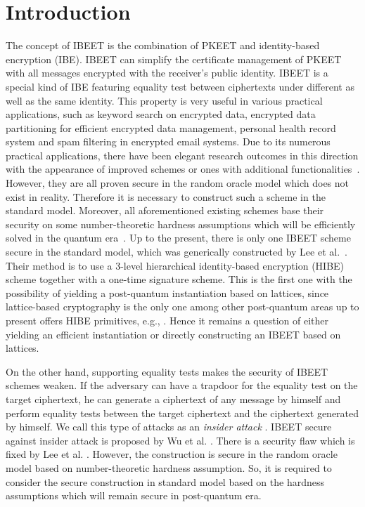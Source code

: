 \documentclass[runningheads]{llncs}
\begin{document}
	\section{Introduction}
	
	The concept of IBEET is the combination of PKEET and identity-based encryption (IBE). IBEET can simplify the certificate management of PKEET with all messages encrypted with the receiver's public identity. IBEET is a special kind of IBE featuring equality test between ciphertexts under different as well as the same identity. This property is very useful in various practical applications, such as keyword search on encrypted data, encrypted data partitioning for efficient encrypted data management, personal health record system and spam filtering in encrypted email systems. Due to its numerous practical applications, there have been elegant research outcomes in this direction with the appearance of improved schemes or ones with additional functionalities~\cite{IBEET-Ma16,Lee16,IBEET-Wu17}. However, they are all proven  secure in the random oracle model which does not exist in reality. Therefore it is necessary to construct such a scheme in the standard model. Moreover, all aforementioned existing schemes base their security on some number-theoretic hardness assumptions which will be efficiently solved in the quantum era~\cite{Shor97}.  Up to the present, there is only one IBEET scheme secure in the standard model, which was generically constructed by Lee et al.~\cite{Lee2016}. Their method is to use a $3$-level hierarchical identity-based encryption (HIBE) scheme together with a one-time signature scheme.  This is the first one with the possibility of yielding a post-quantum instantiation based on lattices, since lattice-based cryptography is the only one among other post-quantum areas up to present offers  HIBE primitives, e.g., \cite{ABB10-EuroCrypt} . Hence it remains a question of either yielding an efficient instantiation or directly constructing an IBEET based on lattices.

On the other hand, supporting equality tests makes the security of IBEET schemes weaken. If the adversary can have a trapdoor for the equality test on the target ciphertext, he can generate a ciphertext of any message by himself and perform equality tests between the target ciphertext and the ciphertext generated by himself. We call this type of attacks as an {\em insider attack} \cite{IBEET-Wu17}. IBEET secure against insider attack is proposed by Wu et al. \cite{IBEET-Wu17}. There is a security flaw which is fixed by Lee et al. \cite{IBEET-Lee18}. However, the construction is secure in the random oracle model based on number-theoretic hardness assumption. So, it is required to consider the secure construction in standard model  based on the hardness assumptions which will remain secure in post-quantum era.
	
\end{document}
